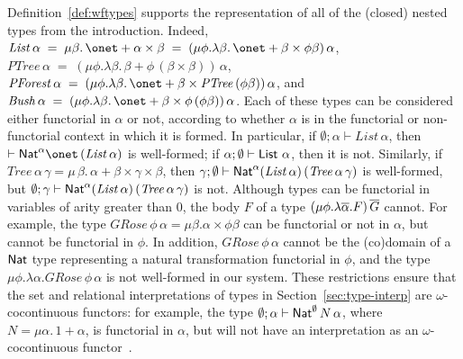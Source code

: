 \documentclass[runningheads]{llncs}
\begin{document}
Definition~\ref{def:wftypes} supports the representation of all of the
(closed) nested types from the introduction. Indeed, $\mathit{List}\,
\alpha \; = \; \mu \beta. \,\onet + \alpha \times \beta\; = \; (\mu
\phi. \lambda \beta.\,\onet + \beta \times \phi \beta)\,\alpha$,\,
$\mathit{PTree}\,\alpha \; = \; (\mu \phi. \lambda \beta.\,\beta +
\phi\,(\beta \times \beta))\,\alpha$, \, $\mathit{PForest}\,\alpha \;
= \; (\mu \phi. \lambda \beta. \,\onet + \beta \times
\mathit{PTree}\,(\phi \beta))\,\alpha$, and $\mathit{Bush}\,\alpha \;
= \; (\mu \phi.\lambda \beta. \,\onet + \beta \times
\phi\,(\phi\beta))\,\alpha$.
Each of these types can be considered either functorial in $\alpha$ or
not, according to whether $\alpha$ is in the functorial or
non-functorial context in which it is formed. In particular, if
$\emptyset;\alpha \vdash \mathit{List} \,\alpha$, then $\vdash
\Nat^\alpha \onet\, (\mathit{List}\,\alpha)$ is well-formed; if
$\alpha;\emptyset \vdash \mathsf{List}\, \,\alpha$, then it is not.  Similarly,
if $\mathit{Tree}\,\alpha\,\gamma = \mu \,\beta.\, \alpha + \beta
\times \gamma \times \beta$, then $\gamma;\emptyset \vdash \mathsf{Nat}^\alpha
(\mathit{List}\, \alpha) \, (\mathit{Tree} \, \alpha\, \gamma)$ is
well-formed, but $\emptyset;\gamma \vdash \mathsf{Nat}^\alpha (\mathit{List}\,
\alpha) \, (\mathit{Tree} \, \alpha\, \gamma)$ is not. Although types
can be functorial in variables of arity greater than $0$, the body $F$
of a type $(\mu \phi.\lambda \overline{\alpha}.F)\,\overline{G}$ cannot. For example,
the type $\mathit{GRose}\, \phi \, \alpha = \mu\beta . \alpha \times
\phi \beta$ can be functorial or not in $\alpha$, but cannot be
functorial in $\phi$. In addition, $\mathit{GRose}\,\phi\,\alpha$
cannot be the (co)domain of a $\mathsf{Nat}$ type representing a natural
transformation functorial in $\phi$, and the type $\mu \phi. \lambda
\alpha. \mathit{GRose}\,\phi\,\alpha$ is not well-formed in our
system. These restrictions ensure that the set and relational
interpretations of types in Section~\ref{sec:type-interp} are
$\omega$-cocontinuous functors: for example, the type $\emptyset;
\alpha \vdash \mathsf{Nat}^\emptyset \, N \, \alpha$, where $N = \mu
\alpha. \,1 + \alpha$, is functorial in $\alpha$, but will not have an
interpretation as an $\omega$-cocontinuous functor~\cite{jp19}.
\end{document}
